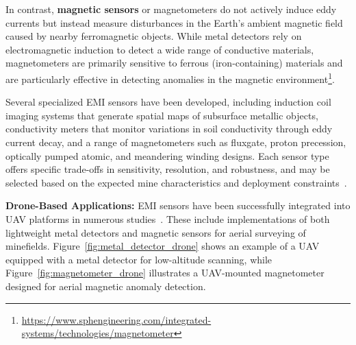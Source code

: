 In contrast, \textbf{magnetic sensors} or magnetometers do not actively induce eddy currents but instead measure disturbances in the Earth's ambient magnetic field caused by nearby ferromagnetic objects. While metal detectors rely on electromagnetic induction to detect a wide range of conductive materials, magnetometers are primarily sensitive to ferrous (iron-containing) materials and are particularly effective in detecting anomalies in the magnetic environment\footnote{\label{magnetometerfootnote}\url{https://www.sphengineering.com/integrated-systems/technologies/magnetometer}}.

Several specialized EMI sensors have been developed, including induction coil imaging systems that generate spatial maps of subsurface metallic objects, conductivity meters that monitor variations in soil conductivity through eddy current decay, and a range of magnetometers such as fluxgate, proton precession, optically pumped atomic, and meandering winding designs. Each sensor type offers specific trade-offs in sensitivity, resolution, and robustness, and may be selected based on the expected mine characteristics and deployment constraints~\cite{Gooneratne2004ARO, Bruschini1997ASO}.


\textbf{Drone-Based Applications:} EMI sensors have been successfully integrated into UAV platforms in numerous studies~\cite{yoo2020drone,yoo2021application,rs16162916,Yoo2024UnmannedAV}. These include implementations of both lightweight metal detectors and magnetic sensors for aerial surveying of minefields. Figure~\ref{fig:metal_detector_drone} shows an example of a UAV equipped with a metal detector for low-altitude scanning, while Figure~\ref{fig:magnetometer_drone} illustrates a UAV-mounted magnetometer designed for aerial magnetic anomaly detection. 

